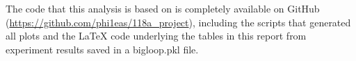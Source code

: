 \documentclass[twoside,11pt]{article}
\begin{document}
		The code that this analysis is based on is completely available on GitHub (\url{https://github.com/phi1eas/118a_project}), including the scripts that generated all plots and the \LaTeX \hspace{.2em} code underlying the tables in this report from experiment results saved in a bigloop.pkl file.
		
		\vskip 0.2in
		
	
	
	
	
	
	
%	
	
	
	
	
\end{document}
